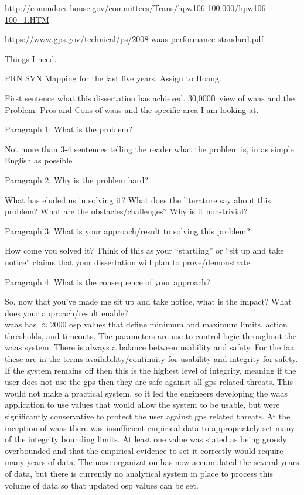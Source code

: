 \href{http://commdocs.house.gov/committees/Trans/hpw106-100.000/hpw106-100\_1.HTM}{http://commdocs.house.gov/committees/Trans/hpw106-100.000/hpw106-100\_1.HTM}

\href{https://www.gps.gov/technical/ps/2008-waas-performance-standard.pdf}{https://www.gps.gov/technical/ps/2008-waas-performance-standard.pdf}

Things I need.

PRN SVN Mapping for the last five years.
Assign to Hoang.


First sentence what this dissertation has achieved.
30,000ft view of \ac{waas} and the Problem. Pros and Cons of \ac{waas} and the specific area I am looking at.

Paragraph 1: What is the problem?

Not more than 3-4 sentences telling the reader what the problem is, in as simple English as possible

Paragraph 2: Why is the problem hard?

What has eluded us in solving it? What does the literature say about this problem? What are the obstacles/challenges? Why is it non-trivial?

Paragraph 3: What is your approach/result to solving this problem?

How come you solved it? Think of this as your “startling” or “sit up and take notice” claims that your dissertation will plan to prove/demonstrate

Paragraph 4: What is the consequence of your approach?

So, now that you’ve made me sit up and take notice, what is the impact? What does your approach/result enable?
~\\

\ac{waas} has $\approx$2000 \ac{osp} values that define minimum and maximum limits, action thresholds, and timeouts. The parameters are use to control logic throughout the \ac{waas} system. There is always a balance between usability and safety.  For the \ac{faa} these are in the terms availability/continuity for usability and integrity for safety.  If the system remains off then this is the highest level of integrity, meaning if the user does not use the \ac{gps} then they are safe against all \ac{gps} related threats.  This would not make a practical system, so it led the engineers developing the \ac{waas} application to use values that would allow the system to be usable, but were significantly conservative to protect the user against \ac{gps} related threats.  At the inception of \ac{waas} there was insufficient empirical data to appropriately set many of the integrity bounding limits.  At least one value was stated as being grossly overbounded and that the empirical evidence to set it correctly would require many years of data.  The \ac{nase} organization has now accumulated the several years of data, but there is currently no analytical system in place to process this volume of data so that updated \ac{osp} values can be set.

